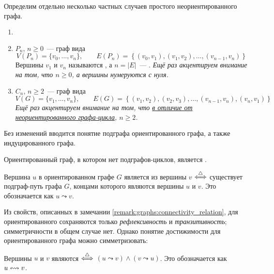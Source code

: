 Определим отдельно несколько частных случаев простого неориентированного графа.
\begin{definition}
    \begin{enumerate}[label=\arabic*)]
        \item[]
        \item
             $ P_n $, $ n \geqslant 0 $~--- граф вида
            \[
                V(P_n) = \{ v_0, \ldots, v_n \}, \qquad
                E(P_n) = \left\{ (v_0, v_1), (v_1, v_2), \ldots, (v_{n-1}, v_n) \right\}
            \]
            Вершины $ v_1 $ и $ v_n $ называются , а $ n = |E| $~--- .
            \textit{Ещё раз акцентируем внимание на том, что $ n \geqslant 0 $, а вершины нумеруются с нуля.}
        \item
             $ C_n $, $ n \geqslant 2 $~--- граф вида
            \[
                V(G) = \{ v_1, \ldots, v_n \}, \qquad
                E(G) = \left\{ (v_1, v_2), (v_2, v_3), \ldots, (v_{n-1}, v_n), (v_n, v_1) \right\}
            \]
            \textit{Ещё раз акцентируем внимание на том, что \uline{в отличие от неориентированного графа-цикла}, $ n \geqslant 2 $.}
    \end{enumerate}
\end{definition}

Без изменений вводится понятие подграфа ориентированного графа, а также индуцированного графа.

\begin{definition}
    Ориентированный граф, в котором нет подграфов-циклов, является .
\end{definition}

\begin{definition}
    Вершина $ u $ в ориентированном графе $ G $ является  из вершины $ v $ $ \overset{\triangle}{\Longleftrightarrow} $ существует подграф-путь графа $ G $,
    концами которого являются вершины $ u $ и $ v $.
    Это обозначается как $ u \leadsto v $.
\end{definition}

Из свойств, описанных в замечании \ref{remark:graphs:connectivity_relation},
для ориентированного сохраняются только \emph{рефлексивность} и \emph{транзитивность};
симметричности в общем случае нет.
Однако понятие достижимости для ориентированного графа можно симметризовать:

\begin{definition}
    Вершины $ u $ и $ v $ являются  $ \overset{\triangle}{\Longleftrightarrow} $ $ (u \leadsto v) \wedge (v \leadsto u) $.
    Это обозначается как $ u \leftrightsquigarrow v $.
\end{definition}

